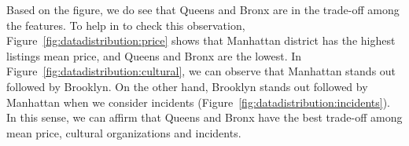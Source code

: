 \documentclass[sigconf]{acmart}
\begin{document}

Based on the figure, we do see that Queens and Bronx are in the trade-off among the features. To help in to check this observation, Figure~\ref{fig:datadistribution:price} shows that Manhattan district has the highest listings mean price, and Queens and Bronx are the lowest. In Figure~\ref{fig:datadistribution:cultural}, we can observe that Manhattan stands out followed by Brooklyn. On the other hand, Brooklyn stands out followed by Manhattan when we consider incidents (Figure~\ref{fig:datadistribution:incidents}). In this sense, we can affirm that Queens and Bronx have the best trade-off among mean price, cultural organizations and incidents.

%	
\end{document}
